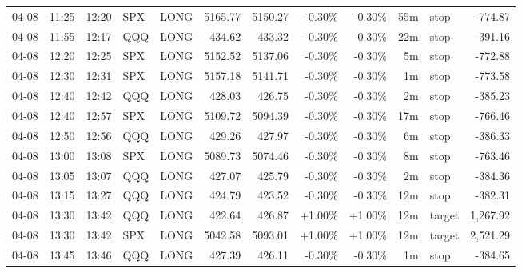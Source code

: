\documentclass[11pt,a4paper]{article}
\begin{document}
\begin{center}
\begin{longtable}{>{\color{txtmain}}l l l l l r r r r r >{\color{txtmain}}l r}
04-08 & 11:25 & 12:20 & SPX & LONG & 5165.77 & 5150.27 & \textcolor{lossred}{-0.30\%} & \textcolor{lossred}{-0.30\%} & 55m & stop & \textcolor{lossred}{-774.87} \\
04-08 & 11:55 & 12:17 & QQQ & LONG & 434.62 & 433.32 & \textcolor{lossred}{-0.30\%} & \textcolor{lossred}{-0.30\%} & 22m & stop & \textcolor{lossred}{-391.16} \\
04-08 & 12:20 & 12:25 & SPX & LONG & 5152.52 & 5137.06 & \textcolor{lossred}{-0.30\%} & \textcolor{lossred}{-0.30\%} & 5m & stop & \textcolor{lossred}{-772.88} \\
04-08 & 12:30 & 12:31 & SPX & LONG & 5157.18 & 5141.71 & \textcolor{lossred}{-0.30\%} & \textcolor{lossred}{-0.30\%} & 1m & stop & \textcolor{lossred}{-773.58} \\
04-08 & 12:40 & 12:42 & QQQ & LONG & 428.03 & 426.75 & \textcolor{lossred}{-0.30\%} & \textcolor{lossred}{-0.30\%} & 2m & stop & \textcolor{lossred}{-385.23} \\
04-08 & 12:40 & 12:57 & SPX & LONG & 5109.72 & 5094.39 & \textcolor{lossred}{-0.30\%} & \textcolor{lossred}{-0.30\%} & 17m & stop & \textcolor{lossred}{-766.46} \\
04-08 & 12:50 & 12:56 & QQQ & LONG & 429.26 & 427.97 & \textcolor{lossred}{-0.30\%} & \textcolor{lossred}{-0.30\%} & 6m & stop & \textcolor{lossred}{-386.33} \\
04-08 & 13:00 & 13:08 & SPX & LONG & 5089.73 & 5074.46 & \textcolor{lossred}{-0.30\%} & \textcolor{lossred}{-0.30\%} & 8m & stop & \textcolor{lossred}{-763.46} \\
04-08 & 13:05 & 13:07 & QQQ & LONG & 427.07 & 425.79 & \textcolor{lossred}{-0.30\%} & \textcolor{lossred}{-0.30\%} & 2m & stop & \textcolor{lossred}{-384.36} \\
04-08 & 13:15 & 13:27 & QQQ & LONG & 424.79 & 423.52 & \textcolor{lossred}{-0.30\%} & \textcolor{lossred}{-0.30\%} & 12m & stop & \textcolor{lossred}{-382.31} \\
04-08 & 13:30 & 13:42 & QQQ & LONG & 422.64 & 426.87 & \textcolor{wingreen}{+1.00\%} & \textcolor{wingreen}{+1.00\%} & 12m & target & \textcolor{wingreen}{1,267.92} \\
04-08 & 13:30 & 13:42 & SPX & LONG & 5042.58 & 5093.01 & \textcolor{wingreen}{+1.00\%} & \textcolor{wingreen}{+1.00\%} & 12m & target & \textcolor{wingreen}{2,521.29} \\
04-08 & 13:45 & 13:46 & QQQ & LONG & 427.39 & 426.11 & \textcolor{lossred}{-0.30\%} & \textcolor{lossred}{-0.30\%} & 1m & stop & \textcolor{lossred}{-384.65} \\

\end{longtable}
\end{center}
\end{document}
